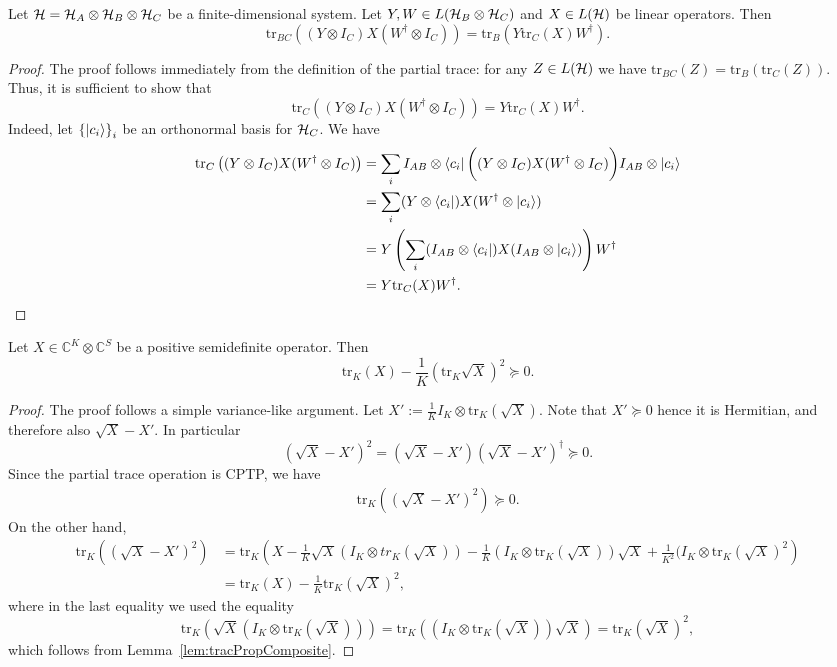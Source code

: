 \documentclass[10pt]{article}
\newcommand{\tr}{\mathrm{tr}}
\newcommand{\C}{\mathbb{C}}
\newcommand{\p}[1]{\left(#1\right)}
\newcommand{\ppp}[1]{\left\{#1\right\}}
\begin{document}
\begin{lemma}\label{lem:tracPropComposite}
Let ${\cal H}={\cal H}_A\otimes {\cal H}_{B}\otimes {\cal H}_C$ be a finite-dimensional system. Let $Y,W\in L({\cal H}_B\otimes {\cal H}_C)$ and $X\in L({\cal H})$  be linear operators. Then
\[\tr_{BC}\p{(Y\otimes I_{C})X(W^\dag\otimes I_{C})}=\tr_{B}\p{Y\tr_{C}(X) W^\dag}.\]
\end{lemma}
\begin{proof}
    The proof follows immediately from the definition of the partial trace: for any $Z\in L({\cal H})$ we have $\tr_{BC}(Z)=\tr_B(\tr_C(Z))$. Thus, it is sufficient to show that 
    \[\tr_C\p{(Y\otimes I_{C})X(W^\dag\otimes I_{C})}=Y\tr_{C}(X) W^\dag.\]
    Indeed, let $\ppp{\ket{c_i}}_i$ be an orthonormal basis for ${\cal H}_C$. We have 
    \begin{align*}
        \tr_C\p{(Y\otimes I_{C})X(W^\dag\otimes I_{C})}&=\sum_{i}I_{AB}\otimes  \bra{c_i}  \bigg((Y\otimes I_{C})X(W^\dag\otimes I_{C})\bigg)I_{AB}\otimes\ket{c_i}\\&
        =\sum_{i}(Y\otimes  \bra{c_i})  X (W^\dag\otimes\ket{c_i})\\&
        =Y\p{\sum_{i}(I_{AB}\otimes  \bra{c_i})  X (I_{AB}\otimes\ket{c_i}) }W^\dag\\
        &=Y\tr_C(X) W^\dag.   \qedhere
    \end{align*}
\end{proof}
\begin{lemma}\label{lem:partialTacesSqrts}
    Let $X\in \C^{K}\otimes \C^S$ be a positive semidefinite operator. Then 
    \[\tr_K(X)-\frac{1}{K}\p{\tr_K\sqrt{X}}^2\succeq 0.\]
\end{lemma}
\begin{proof}
    The proof follows a simple variance-like 
        argument. Let $X':=\frac{1}{K}I_{K}\otimes \tr_K(\sqrt{X})$. Note that $X'\succeq 0$ hence it is Hermitian, and therefore also $\sqrt{X}-X'$. In particular 
    \[(\sqrt{X}-X')^2=(\sqrt{X}-X')(\sqrt{X}-X')^\dag\succeq 0.\]
    Since the partial trace operation is CPTP, we have 
    \begin{align}
        \tr_K\p{(\sqrt{X}-X')^2}\succeq 0. \label{eq:partialTracePositiveSquare}
    \end{align}
    On the other hand, 
\begin{align*}
    \tr_K\p{(\sqrt{X}-X')^2}&=\tr_K\p{X- \frac{1}{K}\sqrt{X}(I_{K}\otimes tr_K(\sqrt{X})) -\frac{1}{K}(I_{K}\otimes \tr_K(\sqrt{X}))\sqrt{X} +\frac{1}{K^2}(I_{K}\otimes \tr_K(\sqrt{X})^2}\\
    &=\tr_{K}(X)-\frac{1}{K}\tr_K\p{\sqrt{X}}^2,
\end{align*}
where in the last equality we used the equality 
\[\tr_K\p{\sqrt{X}(I_{K}\otimes \tr_K(\sqrt{X}))}=\tr_K\p{(I_{K}\otimes \tr_K(\sqrt{X}))\sqrt{X}}=\tr_K\p{\sqrt{X}}^2,\]
which follows from Lemma~\ref{lem:tracPropComposite}.
\end{proof}
\end{document}
